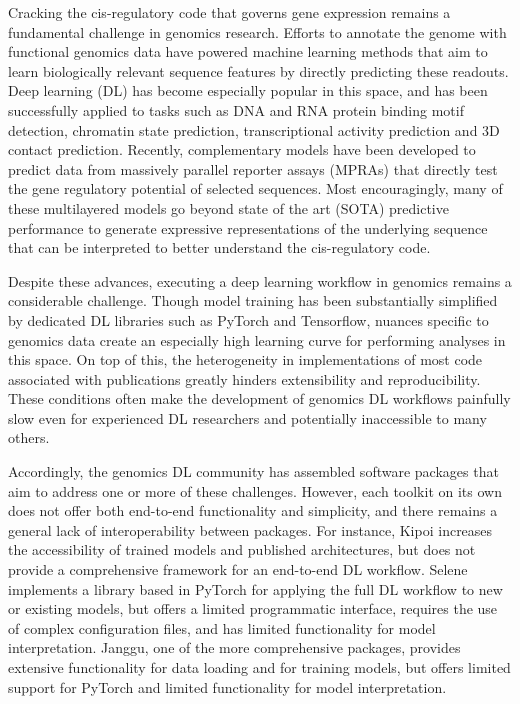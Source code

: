 Cracking the cis-regulatory code that governs gene expression remains a fundamental challenge in genomics research. Efforts to annotate the genome with functional genomics data\cite{ENCODE_Project_Consortium2012-tn} have powered machine learning methods that aim to learn biologically relevant sequence features by directly predicting these readouts. Deep learning (DL) has become especially popular in this space, and has been successfully applied to tasks such as DNA and RNA protein binding motif detection\cite{Alipanahi2015-ef,Pan2018-of,Quang2019-gi,Koo2021-ly,Wang2018-ls}, chromatin state prediction\cite{Zhou2015-rk,Quang2016-ll,Kelley2016-oh,Kelley2018-if,Minnoye2020-vz,Atak2021-sz,Li2021-sb,Yuan2022-gg,Chen2022-bn,Janssens2022-vy,Nair2019-um,Ullah2021-th}, transcriptional activity prediction\cite{Kelley2018-if,Zhou2018-mt,Agarwal2020-os,Avsec2021-hh,Karbalayghareh2022-gt} and 3D contact prediction\cite{Fudenberg2020-gs,Zhou2022-mp,Yang2021-yq,Tan2023-ro}. Recently, complementary models have been developed to predict data from massively parallel reporter assays (MPRAs) that directly test the gene regulatory potential of selected sequences\cite{De_Almeida2022-aa,Movva2019-jo,Jores2021-iu}. Most encouragingly, many of these multilayered models go beyond state of the art (SOTA) predictive performance to generate expressive representations of the underlying sequence that can be interpreted to better understand the cis-regulatory code\cite{Avsec2021-sw,Janssens2022-vy,De_Almeida2022-aa}.

Despite these advances, executing a deep learning workflow in genomics remains a considerable challenge. Though model training has been substantially simplified by dedicated DL libraries such as PyTorch\cite{Paszke2019-fm} and Tensorflow\cite{Abadi2016-il}, nuances specific to genomics data create an especially high learning curve for performing analyses in this space. On top of this, the heterogeneity in implementations of most code associated with publications greatly hinders extensibility and reproducibility. These conditions often make the development of genomics DL workflows painfully slow even for experienced DL researchers and potentially inaccessible to many others.

Accordingly, the genomics DL community has assembled software packages\cite{Budach2018-va,Chen2019-dt,Kopp2020-fw,Avsec2019-ke,Chalupova2022-kv} that aim to address one or more of these challenges. However, each toolkit on its own does not offer both end-to-end functionality and simplicity, and there remains a general lack of interoperability between packages. For instance, Kipoi\cite{Avsec2019-ke} increases the accessibility of trained models and published architectures, but does not provide a comprehensive framework for an end-to-end DL workflow. Selene\cite{Chen2019-dt} implements a library based in PyTorch for applying the full DL workflow to new or existing models, but offers a limited programmatic interface, requires the use of complex configuration files, and has limited functionality for model interpretation. Janggu\cite{Kopp2020-fw}, one of the more comprehensive packages, provides extensive functionality for data loading and for training models, but offers limited support for PyTorch and limited functionality for model interpretation. 

